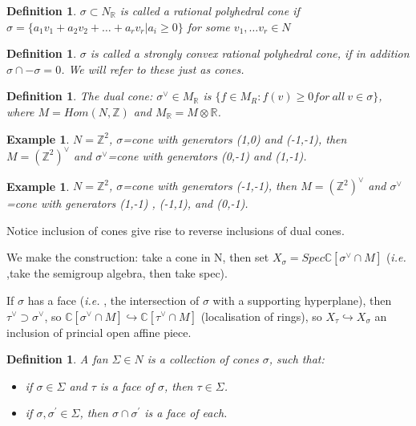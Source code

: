 \documentclass[a4paper]{article}
\newtheorem{defn}[thm]{Definition}
\newtheorem{eg}[thm]{Example}
\newcommand{\ie}{\emph{i.e.} }
\newcommand{\R}{\mathbb{R}}
\newcommand{\C}{\mathbb{C}}
\newcommand{\Z}{\mathbb{Z}}
\begin{document}
	\begin{defn}
		$\sigma \subset N_{\R}$ is called a rational polyhedral cone
		if $\sigma=\{a_1 v_1+a_2 v_2+\ldots+ a_r v_r|a_i \geq 0\}$ for some $v_1, \ldots v_r \in N$ 
	\end{defn}
	
	\begin{defn}
		$\sigma$ is called a strongly convex rational polyhedral cone, if in addition $\sigma \cap -\sigma=0$.  We will refer to these just as cones.
	\end{defn}
	
	
	\begin{defn}
		The dual cone: $\sigma^{\vee} \in M_{\R}$ is $\{f \in M_{R}: f(v)\geq 0 for\: all\: v \in \sigma\}$, where $M=Hom(N,\Z)$ and $M_\R=M\otimes \R$.
	\end{defn}
	
	\begin{eg}
		$N=\Z^2$, $\sigma$=cone with generators (1,0) and (-1,-1), then $M=(\Z^2)^{\vee}$ and $\sigma^\vee$=cone with generators (0,-1) and (1,-1).
	\end{eg}
	
	\begin{eg}
		$N=\Z^2$, $\sigma$=cone with generators (-1,-1), then $M=(\Z^2)^{\vee}$ and $\sigma^\vee$=cone with generators (1,-1) , (-1,1), and (0,-1).
	\end{eg}
	
	Notice inclusion of cones give rise to reverse inclusions of dual cones.
	
	We make the construction: take a cone in N, then set $X_\sigma=Spec \C[\sigma^{\vee}\cap M]$ (\ie,take the semigroup algebra, then take spec).
	
	If $\sigma$ has a face (\ie, the intersection of $\sigma$ with a supporting hyperplane), then $\tau^\vee \supset \sigma^\vee$, so $\C[\sigma^{\vee}\cap M] \hookrightarrow \C[\tau^{\vee}\cap M]$ (localisation of rings), 
	so $X_\tau \hookrightarrow X_\sigma$ an inclusion of princial open affine piece.
	
	\begin{defn}
		A fan $\Sigma \in N$ is a collection of cones $\sigma$, such that:
		\begin{itemize}
			\item if $\sigma \in \Sigma$ and $\tau$ is a face of $\sigma$, then $\tau \in \Sigma$.
			\item if $\sigma, \sigma^{'} \in \Sigma$, then $\sigma \cap \sigma^{'}$ is a face of each.
		\end{itemize}
	\end{defn}
	
\end{document}
